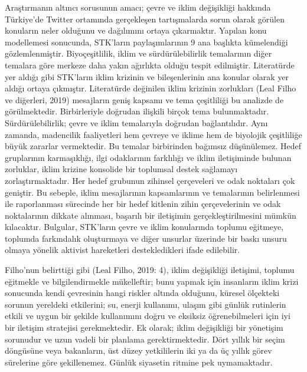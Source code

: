\documentclass[
]{book}
\begin{document}
Araştırmanın altıncı sorusunun amacı; çevre ve iklim değişikliği hakkında Türkiye'de Twitter ortamında gerçekleşen tartışmalarda sorun olarak görülen konuların neler olduğunu ve dağılımını ortaya çıkarmaktır. Yapılan konu modellemesi sonucunda, STK'ların paylaşımlarının 9 ana başlıkta kümelendiği gözlemlenmiştir. Biyoçeşitlilik, iklim ve sürdürülebilirlik temalarının diğer temalara göre merkeze daha yakın ağırlıkta olduğu tespit edilmiştir. Literatürde yer aldığı gibi STK'ların iklim krizinin ve bileşenlerinin ana konular olarak yer aldığı ortaya çıkmıştır. Literatürde değinilen iklim krizinin zorlukları (Leal Filho ve diğerleri, 2019) mesajların geniş kapsamı ve tema çeşitliliği bu analizde de görülmektedir. Birbirleriyle doğrudan ilişkili birçok tema bulunmaktadır. Sürdürülebilirlik; çevre ve iklim temalarıyla doğrudan bağlantılıdır. Aynı zamanda, madencilik faaliyetleri hem çevreye ve iklime hem de biyolojik çeşitliliğe büyük zararlar vermektedir. Bu temalar birbirinden bağımsız düşünülemez. Hedef gruplarının karmaşıklığı, ilgi odaklarının farklılığı ve iklim iletişiminde bulunan zorluklar, iklim krizine konsolide bir toplumsal destek sağlamayı zorlaştırmaktadır. Her hedef grubunun zihinsel çerçeveleri ve odak noktaları çok geniştir. Bu sebeple, iklim mesajlarının kapsamlarının ve temalarının belirlenmesi ile raporlanması sürecinde her bir hedef kitlenin zihin çerçevelerinin ve odak noktalarının dikkate alınması, başarılı bir iletişimin gerçekleştirilmesini mümkün kılacaktır. Bulgular, STK'ların çevre ve iklim konularında toplumu eğitmeye, toplumda farkındalık oluşturmaya ve diğer unsurlar üzerinde bir baskı unsuru olmaya yönelik aktivist hareketleri destekledikleri ifade edilebilir.

Filho'nun belirttiği gibi (Leal Filho, 2019: 4), iklim değişikliği iletişimi, toplumu eğitmekle ve bilgilendirmekle mükelleftir; bunu yapmak için insanların iklim krizi sonucunda kendi çevresinin hangi riskler altında olduğunu, küresel ölçekteki sorunun yereldeki etkilerini; su, enerji kullanımı, ulaşım gibi günlük rutinlerin etkili ve uygun bir şekilde kullanımını doğru ve eksiksiz öğrenebilmeleri için iyi bir iletişim stratejisi gerekmektedir. Ek olarak; iklim değişikliği bir yönetişim sorunudur ve uzun vadeli bir planlama gerektirmektedir. Dört yıllık bir seçim döngüsüne veya bakanların, üst düzey yetkililerin iki ya da üç yıllık görev sürelerine göre şekillenemez. Günlük siyasetin ritmine pek uymamaktadır.
\end{document}
